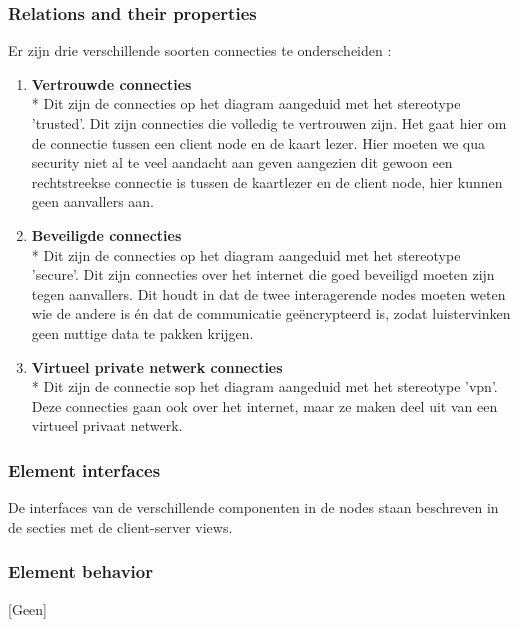 \documentclass[a4paper,10pt]{article}
\begin{document}
\subsubsection*{Relations and their properties}
\label{subsubsec:relations_deployment}
Er zijn drie verschillende soorten connecties te onderscheiden : 
\begin{enumerate}
 \item \textbf{Vertrouwde connecties}\\*
Dit zijn de connecties op het diagram aangeduid met het stereotype 'trusted'. Dit zijn connecties die volledig te vertrouwen zijn. Het gaat hier om de connectie tussen een client node en de kaart lezer. Hier moeten we qua security niet al te veel aandacht aan geven aangezien dit gewoon een rechtstreekse connectie is tussen de kaartlezer en de client node, hier kunnen geen aanvallers aan. 
\item \textbf{Beveiligde connecties}\\*
Dit zijn de connecties op het diagram aangeduid met het stereotype 'secure'. Dit zijn connecties over het internet die goed beveiligd moeten zijn tegen aanvallers. Dit houdt in dat de twee interagerende nodes moeten weten wie de andere is én dat de communicatie geëncrypteerd is, zodat luistervinken geen nuttige data te pakken krijgen.
\item \textbf{Virtueel private netwerk connecties}\\*
Dit zijn de connectie sop het diagram aangeduid met het stereotype 'vpn'. Deze connecties gaan ook over het internet, maar ze maken deel uit van een virtueel privaat netwerk.
\end{enumerate}

\subsubsection*{Element interfaces}

De interfaces van de verschillende componenten in de nodes staan beschreven in de secties met de client-server views.

\subsubsection*{Element behavior}
[Geen]
\clearpage
\end{document}

